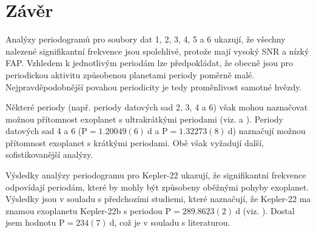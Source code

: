 \documentclass[a4paper,11pt,twocolumn]{article}
\begin{document}
    \newpage
    \section{Závěr}
        Analýzy periodogramů pro soubory dat 1, 2, 3, 4, 5 a 6 ukazují, že všechny nalezené signifikantní frekvence jsou spolehlivé, protože mají vysoký SNR a nízký FAP. Vzhledem k jednotlivým periodám lze předpokládat, že obecně jsou pro periodickou aktivitu způsobenou planetami periody poměrně malé. Nejpravděpodobnější povahou periodicity je tedy proměnlivost samotné hvězdy. 

        Některé periody (např. periody datových sad 2, 3, 4 a 6) však mohou naznačovat možnou přítomnost exoplanet s ultrakrátkými periodami (viz. \citet{frustagli2020} a \citet{wang2024}). Periody datových sad 4 a 6 ($\text{P} = 1.20049(6) ~ \text{d}$ a $\text{P} = 1.32273(8) ~ \text{d}$) naznačují možnou přítomnost exoplanet s krátkými periodami. Obě však vyžadují další, sofistikovanější analýzy. 
        
        Výsledky analýzy periodogramu pro Kepler-22 ukazují, že signifikantní frekvence odpovídají periodám, které by mohly být způsobeny oběžnými pohyby exoplanet. Výsledky jsou v souladu s předchozími studiemi, které naznačují, že Kepler-22 ma znamou exoplanetu Kepler-22b s periodou $\text{P} = 289.8623(2) ~ \text{d}$ (viz. \citet{borucki2012}). Dostal jsem hodnotu $\text{P} = 234(7) ~ \text{d}$, což je v souladu s literaturou.

    
    
\end{document}
